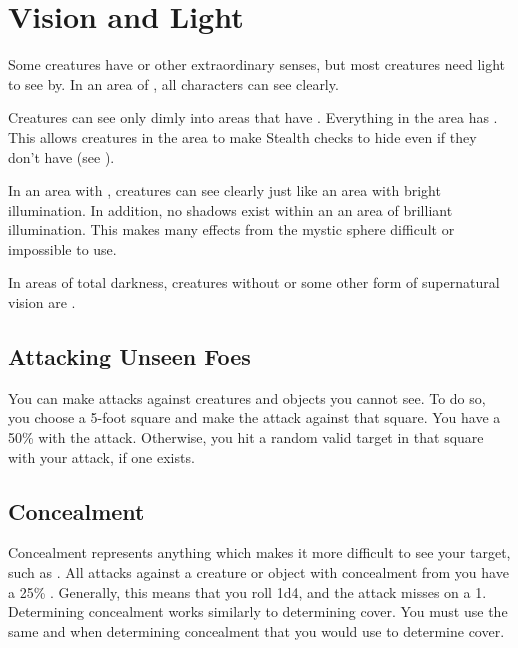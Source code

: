 \section{Vision and Light}\label{Vision and Light}
    Some creatures have  or other extraordinary senses, but most creatures need light to see by. 
    In an area of , all characters can see clearly.

    Creatures can see only dimly into areas that have .
    Everything in the area has .
    This allows creatures in the area to make Stealth checks to hide even if they don't have  (see ).

    In an area with , creatures can see clearly just like an area with bright illumination.
    In addition, no shadows exist within an an area of brilliant illumination.
    This makes many effects from the  mystic sphere difficult or impossible to use.

    In areas of total darkness, creatures without  or some other form of supernatural vision are \blinded.

    \subsection{Attacking Unseen Foes}
        You can make  attacks against creatures and objects you cannot see.
        To do so, you choose a 5-foot square and make the attack against that square.
        You have a 50\%  with the attack.
        Otherwise, you hit a random valid target in that square with your attack, if one exists.

    \subsection{Concealment}\label{Concealment}
        Concealment represents anything which makes it more difficult to see your target, such as .
        All  attacks against a creature or object with concealment from you have a 25\% .
        Generally, this means that you roll 1d4, and the attack misses on a 1.
        Determining concealment works similarly to determining cover.
        You must use the same  and  when determining concealment that you would use to determine cover.

